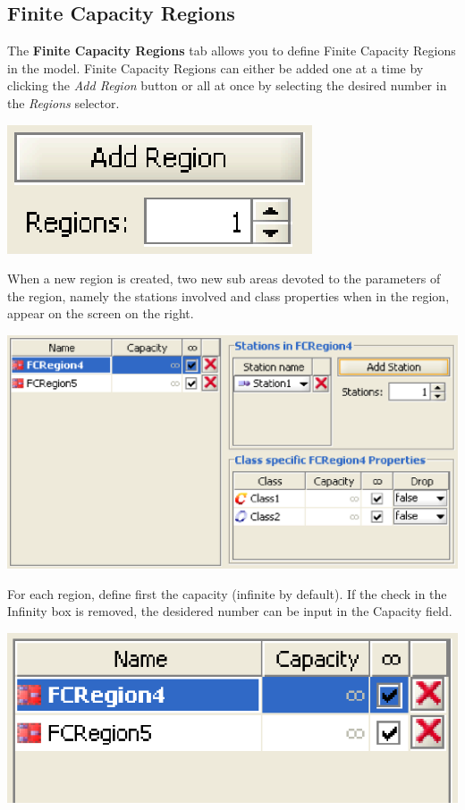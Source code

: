 \begin{description*}
\subsection{Finite Capacity Regions}
\label{sec:FiniteCapacityRegions}
The \textbf{Finite Capacity Regions} tab allows you to define Finite Capacity Regions in the model.
Finite Capacity Regions can either be added one at a time by clicking the \emph{Add Region} button or all at once by selecting the desired number in the \emph{Regions} selector.
\begin{center}
\includegraphics[scale=.5]{img/jsim/add_fcr.eps}
\end{center}
When a new region is created, two new sub areas devoted to the parameters of the region, namely the stations involved and class properties when in the region, appear on the screen on the right.
\begin{center}
\includegraphics[scale=.5]{img/jsim/fcr_bottom.eps}
\end{center}
For each region, define first the capacity (infinite by default). If the check in the Infinity box is removed, the desidered number can be input in the Capacity field.
\begin{center}
\includegraphics[scale=.5]{img/jsim/fcr_selection.eps}

\end{center}
\end{description*}
